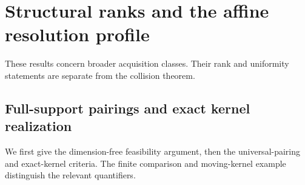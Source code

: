 \documentclass[11pt]{amsart}
\theoremstyle{definition}\newtheorem{definition}[theorem]{Definition}
\theoremstyle{remark}\newtheorem{remark}[theorem]{Remark}
\begin{document}
\section{Structural ranks and the affine resolution profile}
\label{app:structural}
These results concern broader acquisition classes. Their rank and
uniformity statements are separate from the collision theorem.
\begingroup
\let\section\subsection
\let\subsection\subsubsection
\let\subsubsection\paragraph


\endgroup
\section{Full-support pairings and exact kernel realization}
\label{app:pairings}
We first give the dimension-free feasibility argument, then the
universal-pairing and exact-kernel criteria. The finite comparison and
moving-kernel example distinguish the relevant quantifiers.
\begingroup
\let\section\subsection
\let\subsection\subsubsection
\let\subsubsection\paragraph







\endgroup
\end{document}
